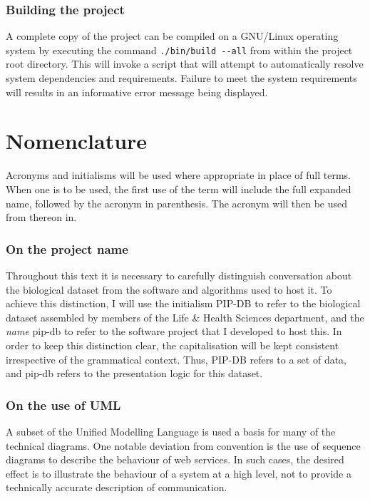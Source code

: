 \newpage
\subsubsection*{Building the project}
A complete copy of the project can be compiled on a GNU/Linux
operating system by executing the command \texttt{./bin/build -{}-all}
from within the project root directory. This will invoke a script that
will attempt to automatically resolve system dependencies and
requirements. Failure to meet the system requirements will results in
an informative error message being displayed.



\section*{Nomenclature}\label{sec:nomenclature}
Acronyms and initialisms will be used where appropriate in place of
full terms. When one is to be used, the first use of the term will
include the full expanded name, followed by the acronym in
parenthesis. The acronym will then be used from thereon in.


\subsubsection*{On the project name}
Throughout this text it is necessary to carefully distinguish
conversation about the biological dataset from the software and
algorithms used to host it. To achieve this distinction, I will use
the initialism PIP-DB to refer to the biological dataset assembled by
members of the Life \& Health Sciences department, and the
\textit{name} pip-db to refer to the software project that I developed
to host this. In order to keep this distinction clear, the
capitalisation will be kept consistent irrespective of the grammatical
context. Thus, PIP-DB refers to a set of data, and pip-db refers to
the presentation logic for this dataset.


\subsubsection*{On the use of UML}
A subset of the Unified Modelling Language \cite{ibm2003uml} is used a
basis for many of the technical diagrams. One notable deviation from
convention is the use of sequence diagrams \cite{ibm2004sequence} to
describe the behaviour of web services. In such cases, the desired
effect is to illustrate the behaviour of a system at a high level, not
to provide a technically accurate description of communication.


